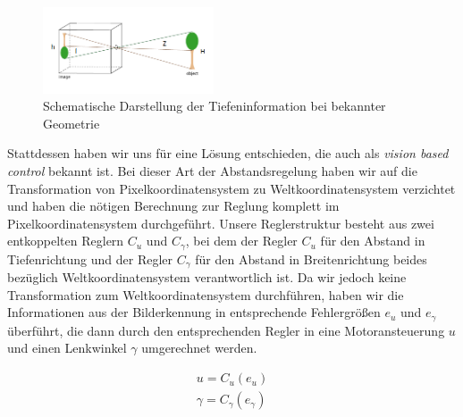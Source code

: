 \documentclass[10pt]{article}
\begin{document}
    \begin{figure}[hbtp]
        \centering
        \includegraphics[width=0.45\textwidth]{Pinholeobject_label}
        \caption{Schematische Darstellung der Tiefeninformation bei bekannter Geometrie}
        \label{fig:reifenradius}
    \end{figure}
    Stattdessen haben wir uns für eine Lösung entschieden, die auch als \textit{vision based control} bekannt ist.
    Bei dieser Art der Abstandsregelung haben wir auf die Transformation von Pixelkoordinatensystem zu Weltkoordinatensystem verzichtet und haben die nötigen Berechnung zur Reglung komplett im Pixelkoordinatensystem durchgeführt.
    Unsere Reglerstruktur besteht aus zwei entkoppelten Reglern $C_u$ und $C_{\gamma}$, bei dem der Regler $C_u$ für den Abstand in Tiefenrichtung und der Regler $C_{\gamma}$ für den Abstand in Breitenrichtung beides bezüglich Weltkoordinatensystem verantwortlich ist.
    Da wir jedoch keine Transformation zum Weltkoordinatensystem durchführen, haben wir die Informationen aus der Bilderkennung in entsprechende Fehlergrößen $e_u$ und $e_{\gamma}$ überführt, die dann durch den entsprechenden Regler in eine Motoransteuerung $u$ und einen Lenkwinkel $\gamma$ umgerechnet werden.

    \begin{eqnarray}
    u = C_u(e_u) \\
    \gamma = C_{\gamma}(e_{\gamma})
    \end{eqnarray}
\end{document}
